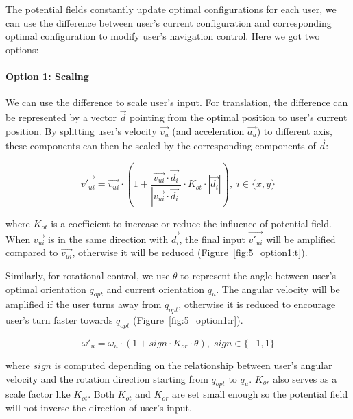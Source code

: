 The potential fields constantly update optimal configurations for each user, we can use the difference between user's current configuration and corresponding optimal configuration to modify user's navigation control. Here we got two options:

\paragraph{Option 1: Scaling}
We can use the difference to scale user's input. For translation, the difference can be represented by a vector $\overrightarrow{d}$ pointing from the optimal position to user's current position. By splitting user's velocity $\overrightarrow{v_{u}}$ (and acceleration $\overrightarrow{a_{u}}$) to different axis, these components can then be scaled by the corresponding components of $\overrightarrow{d}$:   

\begin{equation}
\overrightarrow{v'_{ui}}=\overrightarrow{v_{ui}} \cdot (1+\frac{\overrightarrow{v_{ui}} \cdot \overrightarrow{d_{i}}}{|\overrightarrow{v_{ui}} \cdot \overrightarrow{d_{i}}|} \cdot K_{ot} \cdot |\overrightarrow{d_{i}}|), \;i\in\{x ,y\}
\end{equation}

where $K_{ot}$ is a coefficient to increase or reduce the influence of potential field. When $\overrightarrow{v_{ui}}$ is in the same direction with $\overrightarrow{d_{i}}$, the final input $\overrightarrow{v'_{ui}}$ will be amplified compared to $\overrightarrow{v_{ui}}$, otherwise it will be reduced (Figure~\ref{fig:5_option1:t}).

Similarly, for rotational control, we use $\theta$ to represent the angle between user's optimal orientation $q_{opt}$ and current orientation $q_{u}$. The angular velocity will be amplified if the user turns away from $q_{opt}$, otherwise it is reduced to encourage user's turn faster towards $q_{opt}$ (Figure~\ref{fig:5_option1:r}).

\begin{equation}
\omega'_{u}=\omega_{u} \cdot (1+sign \cdot K_{or} \cdot \theta),\;sign \in \{-1, 1\} 
\end{equation}

where $sign$ is computed depending on the relationship between user's angular velocity and the rotation direction starting from $q_{opt}$ to $q_{u}$. $K_{or}$ also serves as a scale factor like $K_{ot}$. Both $K_{ot}$ and $K_{or}$ are set small enough so the potential field will not inverse the direction of user's input.

